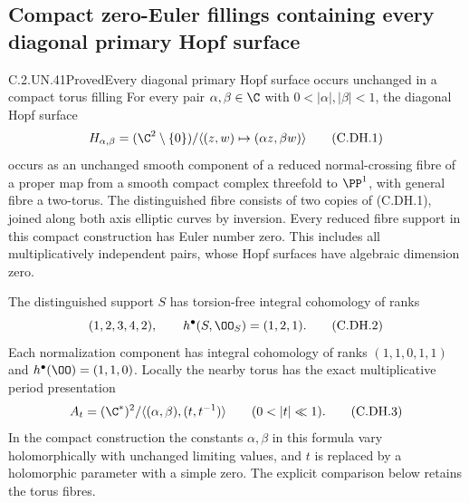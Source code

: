 \subsection{Compact zero-Euler fillings containing every diagonal primary Hopf surface}

\begin{statement}{C.2.UN.41}{Proved}{Every diagonal primary Hopf surface occurs unchanged in a compact torus filling}
For every pair $\alpha,\beta\in\C$ with
$0<|\alpha|,|\beta|<1$, the diagonal Hopf surface
\[
 H_{\alpha,\beta}=(\C^2\setminus\{0\})/
       \langle(z,w)\mapsto(\alpha z,\beta w)\rangle
                                                               \tag{C.DH.1}
\]
occurs as an unchanged smooth component of a
reduced normal-crossing fibre of a proper map
from a smooth compact complex threefold to
$\PP^1$, with general fibre a two-torus.
The distinguished fibre consists of two copies
of (C.DH.1), joined along both axis elliptic
curves by inversion. Every reduced fibre
support in this compact construction has
Euler number zero. This includes all
multiplicatively independent pairs, whose
Hopf surfaces have algebraic dimension zero.

The distinguished support $S$ has torsion-free
integral cohomology of ranks
\[
                  (1,2,3,4,2),\qquad
                  h^\bullet(S,\OO_S)=(1,2,1).        \tag{C.DH.2}
\]
Each normalization component has integral
cohomology of ranks $(1,1,0,1,1)$ and
$h^\bullet(\OO)=(1,1,0)$.
Locally the nearby torus has the exact
multiplicative period presentation
\[
 A_t=(\C^*)^2/
        \langle(\alpha,\beta),(t,t^{-1})\rangle
                    \qquad(0<|t|\ll1).             \tag{C.DH.3}
\]
In the compact construction the constants
$\alpha,\beta$ in this formula vary
holomorphically with unchanged limiting
values, and $t$ is replaced by a holomorphic
parameter with a simple zero. The explicit
comparison below retains the torus fibres.
\end{statement}

